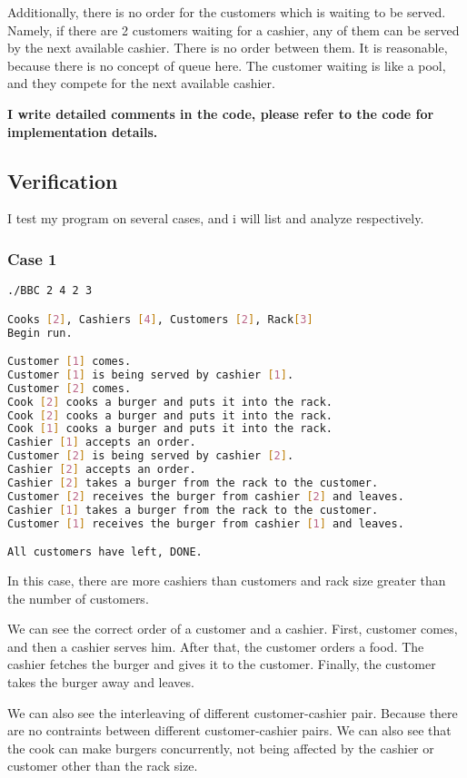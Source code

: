 Additionally, there is no order for the customers which is waiting to be served. Namely, if there are 2 customers waiting for a cashier, any of them can be served by the next available cashier. There is no order between them. 
It is reasonable, because there is no concept of queue here. The customer waiting is like a pool, and they compete for the next available cashier. 

\textbf{I write detailed comments in the code, please refer to the code for implementation details.}

\subsection{Verification}
I test my program on several cases, and i will list and analyze respectively.

\subsubsection{Case 1}
\begin{lstlisting}[language=bash]
./BBC 2 4 2 3

Cooks [2], Cashiers [4], Customers [2], Rack[3]
Begin run.

Customer [1] comes.
Customer [1] is being served by cashier [1].
Customer [2] comes.
Cook [2] cooks a burger and puts it into the rack.
Cook [2] cooks a burger and puts it into the rack.
Cook [1] cooks a burger and puts it into the rack.
Cashier [1] accepts an order.
Customer [2] is being served by cashier [2].
Cashier [2] accepts an order.
Cashier [2] takes a burger from the rack to the customer.
Customer [2] receives the burger from cashier [2] and leaves.
Cashier [1] takes a burger from the rack to the customer.
Customer [1] receives the burger from cashier [1] and leaves.

All customers have left, DONE.
\end{lstlisting}

In this case, there are more cashiers than customers and rack size greater than the number of customers.

We can see the correct order of a customer and a cashier. First, customer comes, and then a cashier serves him. 
After that, the customer orders a food. The cashier fetches the burger and gives it to the customer. 
Finally, the customer takes the burger away and leaves.

We can also see the interleaving of different customer-cashier pair. Because there are no contraints between different customer-cashier pairs.
We can also see that the cook can make burgers concurrently, not being affected by the cashier or customer other than the rack size.

